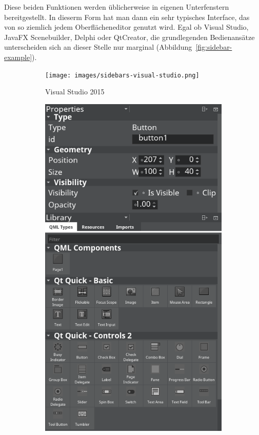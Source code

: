 Diese beiden Funktionen werden üblicherweise in eigenen Unterfenstern bereitgestellt. In dieserm Form hat man dann ein sehr typisches Interface, das von so ziemlich jedem Oberflächeneditor genutzt wird. Egal ob Visual Studio, JavaFX Scenebuilder, Delphi oder QtCreator, die grundlegenden Bedienansätze unterscheiden sich an dieser Stelle nur marginal (Abbildung~\ref{fig:sidebar-example}).

\begin{figure}[h]
  \begin{subfigure}[b]{0.45\textwidth}
      \texttt{[image: images/sidebars-visual-studio.png]}
      \caption{Visual Studio 2015}
      \label{fig:sidebar-example-visual-studio}
  \end{subfigure}\hfill
  \begin{subfigure}[b]{0.45\textwidth}
    \includegraphics[width=\textwidth]{images/sidebars-qt-creator.png}

\end{subfigure}
\end{figure}
